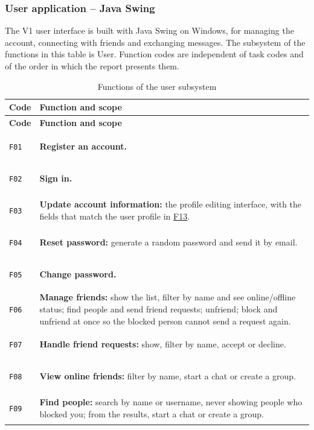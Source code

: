 \subsubsection{User application -- Java Swing}
\label{subsubsec:client-user}

The V1 user interface is built with Java Swing on Windows, for managing the
account, connecting with friends and exchanging messages. The subsystem of the
functions in this table is User. Function codes are independent of task codes and
of the order in which the report presents them.

\begingroup
\small
\begin{longtable}{|C{1.2cm}|L{\dimexpr\textwidth-1.2cm-4\arrayrulewidth\relax}|}
  \caption{Functions of the user subsystem}
  \label{tab:user-features}\\
  \hline
  \textbf{Code} & \textbf{Function and scope}\\
  \hline
  \endfirsthead
  \hline
  \textbf{Code} & \textbf{Function and scope}\\
  \hline
  \endhead
  \hypertarget{F01}{\texttt{F01}} & \textbf{Register an account.}\\
  \hline
  \hypertarget{F02}{\texttt{F02}} & \textbf{Sign in.}\\
  \hline
  \hypertarget{F03}{\texttt{F03}} &
  \textbf{Update account information:} the profile editing interface, with the
  fields that match the user profile in \hyperlink{F13}{F13}.\\
  \hline
  \hypertarget{F04}{\texttt{F04}} &
  \textbf{Reset password:} generate a random password and send it by email.\\
  \hline
  \hypertarget{F05}{\texttt{F05}} & \textbf{Change password.}\\
  \hline
  \hypertarget{F06}{\texttt{F06}} &
  \textbf{Manage friends:} show the list, filter by name and see online/offline
  status; find people and send friend requests; unfriend; block and unfriend at once
  so the blocked person cannot send a request again.\\
  \hline
  \hypertarget{F07}{\texttt{F07}} &
  \textbf{Handle friend requests:} show, filter by name, accept or decline.\\
  \hline
  \hypertarget{F08}{\texttt{F08}} &
  \textbf{View online friends:} filter by name, start a chat or create a group.\\
  \hline
  \hypertarget{F09}{\texttt{F09}} &
  \textbf{Find people:} search by name or username, never showing people who
  blocked you; from the results, start a chat or create a group.\\

\end{longtable}
